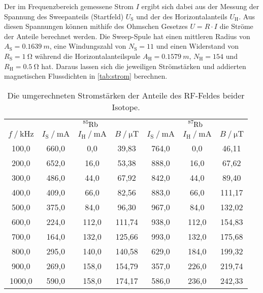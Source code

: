 Der im Frequenzbereich gemessene Strom $I$ ergibt sich dabei aus der Messung der Spannung des Sweepanteils (Startfeld) $U_\text{S}$
und der des Horizontalanteils $U_\text{H}$.
Aus diesen Spannungen können mithife des Ohmschen Gesetzes $U = R \cdot I$ die Ströme der Anteile berechnet werden.
Die Sweep-Spule hat einen mittleren Radius von $A_\text{S} = \qty{0.1639}{m}$,
eine Windungszahl von $N_\text{S} = 11$
und einen Widerstand von  $R_\text{S} = \qty{1}{\ohm}$
während die Horizontalanteilspule $A_\text{H} = \qty{0.1579}{m}$, $N_\text{H} = 154$ und $R_\text{H} = \qty{0.5}{\ohm}$ hat.
Daraus lassen sich die jeweiligen Strömstärken und addierten magnetischen Flussdichten in \autoref{tab:strom} berechnen.
\begin{table}
    \centering
    \caption{Die umgerechneten Stromstärken der Anteile des RF-Feldes beider Isotope.}
    \label{tab:strom}
    \begin{tabular}{c c c c c c c}
        \toprule 
        & \multicolumn{3}{c}{$\ce{^{85}_{}Rb}$} &
        \multicolumn{3}{c}{$\ce{^{87}_{}Rb}$} \\
        \cmidrule(lr){2-4}\cmidrule(lr){5-7}
    
        $f \mathbin{/} \mathrm{kHz}$ &
        $I_\text{S} \mathbin{/} \unit{\milli\ampere}$ &
        $I_\text{H} \mathbin{/} \unit{\milli\ampere}$ &
        $B \mathbin{/} \unit{\micro\tesla}$ &
        $I_\text{S} \mathbin{/} \unit{\milli\ampere}$ & 
        $I_\text{H} \mathbin{/} \unit{\milli\ampere}$ &
        $B \mathbin{/} \unit{\micro\tesla}$ \\
        \midrule
        100,0 &   660,0 &      0,0 &      39,83 &   764,0 &      0,0 &      46,11 \\
        200,0 &   652,0 &     16,0 &      53,38 &   888,0 &     16,0 &      67,62 \\
        300,0 &   486,0 &     44,0 &      67,92 &   842,0 &     44,0 &      89,40 \\
        400,0 &   409,0 &     66,0 &      82,56 &   883,0 &     66,0 &     111,17 \\
        500,0 &   375,0 &     84,0 &      96,30 &   967,0 &     84,0 &     132,02 \\
        600,0 &   224,0 &    112,0 &     111,74 &   938,0 &    112,0 &     154,83 \\
        700,0 &   164,0 &    132,0 &     125,66 &   993,0 &    132,0 &     175,68 \\
        800,0 &   295,0 &    140,0 &     140,58 &   629,0 &    184,0 &     199,32 \\
        900,0 &   269,0 &    158,0 &     154,79 &   357,0 &    226,0 &     219,74 \\
       1000,0 &   590,0 &    158,0 &     174,17 &   586,0 &    236,0 &     242,33 \\
        \bottomrule
    \end{tabular}        
\end{table}